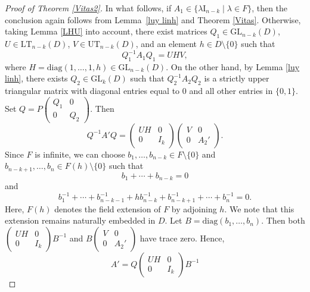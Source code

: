 \documentclass[11pt]{article}
\theoremstyle{definition}
\begin{document}
{{{{\begin{proof}[Proof of Theorem {\rm \ref{Vitas2}}]
					In what follows,	if \( A_1 \in \{ \lambda \mathrm{I}_{n-k} \mid \lambda \in F \} \), then the conclusion again follows from Lemma~\ref{luy linh} and Theorem \ref{Vitas}. Otherwise, taking Lemma \ref{LHU} into account, there exist matrices \( Q_1 \in \mathrm{GL}_{n-k}(D) \), \( U \in \mathrm{LT}_{n-k}(D) \), \( V \in \mathrm{UT}_{n-k}(D) \), and an element \( h \in D\setminus\{0\} \) such that
					\[
					Q_1^{-1} A_1 Q_1 = U H V,
					\]
					where \( H = \mathrm{diag}(1, \ldots, 1, h) \in \mathrm{GL}_{n-k}(D) \). On the other hand, by Lemma \ref{luy linh}, there exists \( Q_2 \in \mathrm{GL}_k(D) \) such that \( Q_2^{-1} A_2 Q_2 \) is a strictly upper triangular matrix with diagonal entries equal to \( 0 \) and all other entries in \( \{0,1\} \).	Set
					$
					Q = P
					\begin{pmatrix}
						Q_1 & 0 \\
						0 & Q_2
					\end{pmatrix}.
					$
					Then
					\[
					Q^{-1} A' Q =
					\begin{pmatrix}
						U H & 0 \\
						0 & I_k
					\end{pmatrix}
					\begin{pmatrix}
						V & 0 \\
						0 & A_2'
					\end{pmatrix}.
					\]	Since \( F \) is infinite, we can choose \( b_1, \ldots, b_{n-k} \in F \setminus \{0\} \) and \( b_{n-k+1}, \ldots, b_n \in F(h) \setminus \{0\} \) such that
					\[
					b_1 + \cdots + b_{n-k} = 0
					\]
					and
					\[
					b_1^{-1} + \cdots + b_{n-k-1}^{-1} + h b_{n-k}^{-1} + b_{n-k+1}^{-1} + \cdots + b_n^{-1} = 0.
					\] Here, $F(h)$ denotes the field extension of $F$ by adjoining $h$. We note that this extension remains naturally embedded in $D$. Let \( B = \mathrm{diag}(b_1, \ldots, b_n) \). Then both
					$
					\begin{pmatrix}
						U H & 0 \\
						0 & I_k
					\end{pmatrix}
					B^{-1}
					$ and
					$B
					\begin{pmatrix}
						V & 0 \\
						0 & A_2'
					\end{pmatrix}
					$
					have trace zero. Hence,
					\[
					A' =
					Q
					\begin{pmatrix}
						U H & 0 \\
						0 & I_k
					\end{pmatrix}
					B^{-1}
\]
\end{proof}}}}}
\end{document}
